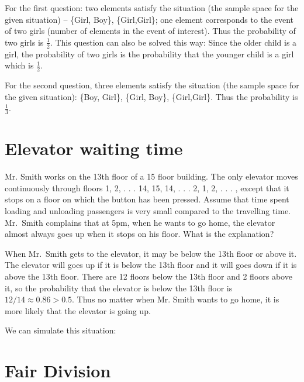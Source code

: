 For the first question: two elements satisfy the situation (the sample space for
the given situation) -- \{Girl, Boy\}, \{Girl,Girl\}; one element corresponds to
the event of two girls (number of elements in the event of interest). Thus the
probability of two girls is $\frac{1}{2}$. This question can also be solved this
way: Since the older child is a girl, the probability of two girls is the
probability that the younger child is a girl which is $\frac{1}{2}$.

For the second question, three elements satisfy the situation (the sample space
for the given situation): \{Boy, Girl\}, \{Girl, Boy\}, \{Girl,Girl\}. Thus the
probability is $\frac{1}{3}$.

\hypertarget{example-elevator-waiting-time}{%
  \section{Elevator waiting
    time}\label{example-elevator-waiting-time}}
\begin{example}
  Mr. Smith works on the 13th floor of a 15 floor building. The only elevator
  moves continuously through floors 1, 2, . . . 14, 15, 14, . . . 2, 1, 2,
  . . . , except that it stops on a floor on which the button has been
  pressed. Assume that time spent loading and unloading passengers is very small
  compared to the travelling time.  Mr.~Smith complains that at 5pm, when he
  wants to go home, the elevator almost always goes up when it stops on his
  floor. What is the explanation?
\end{example}

When Mr.~Smith gets to the elevator, it may be below the 13th floor or above
it. The elevator will goes up if it is below the 13th floor and it will goes
down if it is above the 13th floor. There are 12 floors below the 13th floor and
2 floors above it, so the probability that the elevator is below the 13th floor
is $12/14\approx0.86>0.5$. Thus no matter when Mr. Smith wants to go home, it is
more likely that the elevator is going up.

We can simulate this situation:  




\hypertarget{Fair-Division}{%
  \section{Fair Division}\label{Fair-Division}}

